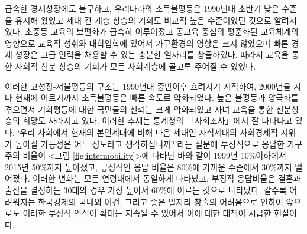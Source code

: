 급속한 경제성장에도 불구하고, 우리나라의 소득불평등은 1990년대 초반기 낮은 수준을 유지해 왔었고 세대 간 계층 상승의 기회도 비교적 높은 수준이었던 것으로 알려져 있다. 초중등 교육의 보편화가 급속히 이루어졌고 공교육 중심의 평준화된 교육체계의 영향으로 교육적 성취와 대학입학에 있어서 가구환경의 영향은 크지 않았으며 빠른 경제 성장은 고급 인력을 채용할 수 있는 충분한 일자리를 창출하였다. 따라서 교육을 통한 사회적 신분 상승의 기회가 모든 사회계층에 골고루 주어질 수 있었다.
 
이러한 고성장-저불평등의 구조는 1990년대 중반이후 흐려지기 시작하여, 2000년을 지나 현재에 이르기까지 소득불평등은 빠른 속도로 악화되었다. 높은 불평등과 양극화를 겪으면서 기회평등에 대한 국민들의 신뢰는 크게 약화되었고 자녀 교육을 통한 신분상승의 희망도 사라지고 있다. 이러한 추세는 통계청의 「사회조사」에서 잘 나타나고 있다. `우리 사회에서 현재의 본인세대에 비해 다음 세대인 자식세대의 사회경제적 지위가 높아질 가능성은 어느 정도라고 생각하십니까?'라는 질문에 부정적으로 응답한 가구주의 비율이 <그림 \ref{fig:intermobility}>에 나타난 바와 같이 1999년 10\%이하에서 2015년 50\%까지 높아졌고, 긍정적인 응답 비율은 80\%에 가까운 수준에서 30\%까지 떨어졌다. 이러한 변화는 모든 연령대에서 동일하게 나타났고, 부정적 응답비율은 결혼과 출산을 결정하는 30대의 경우 가장 높아서 60\%에 이르는 것으로 나타났다. 갈수록 어려워지는 한국경제의 국내외 여건, 그리고 좋은 일자리 창출의 어려움으로 인하여 앞으로도 이러한 부정적 인식이 확대는 지속될 수 있어서 이에 대한 대책이 시급한 현실이다.


